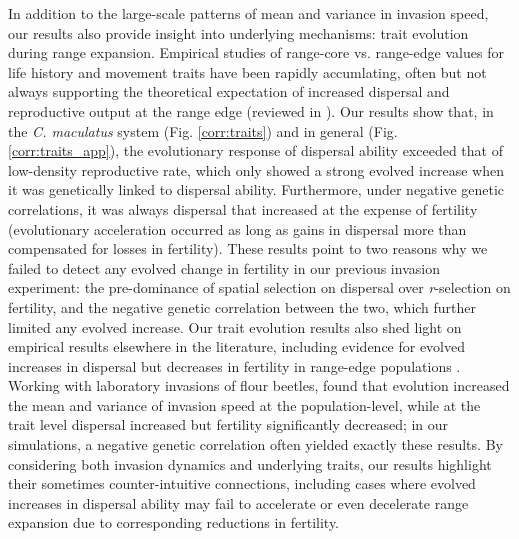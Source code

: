 \documentclass[11pt]{article}
\begin{document}
In addition to the large-scale patterns of mean and variance in invasion speed, our results also provide insight into underlying mechanisms: trait evolution during range expansion.
Empirical studies of range-core vs. range-edge values for life history and movement traits have been rapidly accumlating, often but not always supporting the theoretical expectation of increased dispersal and reproductive output at the range edge (reviewed in \citealt{chuang_expanding_2016}).
Our results show that, in the \textit{C. maculatus} system (Fig. \ref{corr:traits}) and in general (Fig. \ref{corr:traits_app}), the evolutionary response of dispersal ability exceeded that of low-density reproductive rate, which only showed a strong evolved increase when it was genetically linked to dispersal ability.
Furthermore, under negative genetic correlations, it was always dispersal that increased at the expense of fertility (evolutionary acceleration occurred as long as gains in dispersal more than compensated for losses in fertility).
These results point to two reasons why we failed to detect any evolved change in fertility in our previous invasion experiment: the pre-dominance of spatial selection on dispersal over \textit{r}-selection on fertility, and the negative genetic correlation between the two, which further limited any evolved increase.
Our trait evolution results also shed light on empirical results elsewhere in the literature, including evidence for evolved increases in dispersal but decreases in fertility in range-edge populations \citep{simmons_changes_2004,hughes_evolutionary_2003}.
Working with laboratory invasions of flour beetles, \cite{weiss-lehman_rapid_2017} found that evolution increased the mean and variance of invasion speed at the population-level, while at the trait level dispersal increased but fertility significantly decreased; in our simulations, a negative genetic correlation often yielded exactly these results. 
By considering both invasion dynamics and underlying traits, our results highlight their sometimes counter-intuitive connections, including cases where evolved increases in dispersal ability may fail to accelerate or even decelerate range expansion due to corresponding reductions in fertility.
\end{document}
